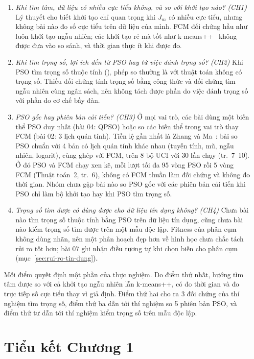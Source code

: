 \begin{enumerate}
  \item \emph{Khi tìm tâm, dữ liệu có nhiều cực tiểu không, và so với khởi tạo nào? (CH1)} Lý thuyết cho biết khởi tạo chỉ
  quan trọng khi $J_m$ có nhiều cực tiểu, nhưng không bài nào đo số cực tiểu trên dữ liệu của mình. FCM đối chứng hầu như luôn
  khởi tạo ngẫu nhiên; các khởi tạo rẻ mà tốt như k-means++~\cite{arthur2007kmeanspp} không được đưa vào so sánh, và thời
  gian thực ít khi được đo.
  \item \emph{Khi tìm trọng số, lợi ích đến từ PSO hay từ việc đánh trọng số? (CH2)} Khi PSO tìm trọng số thuộc tính
  (\cite{lu2011psovw,oneill2018psofw}), phép so thường là với thuật toán không có trọng số. Thiếu đối chứng tính trọng số
  bằng công thức và đối chứng tìm ngẫu nhiên cùng ngân sách, nên không tách được phần do việc đánh trọng số với phần do cơ
  chế bầy đàn.
  \item \emph{PSO gốc hay phiên bản cải tiến? (CH3)} Ở mọi vai trò, các bài dùng một biến thể PSO duy nhất (bài 04: QPSO) hoặc
  so các biến thể trong vai trò thay FCM (bài 02: 3 lịch quán tính). Tiền lệ gần nhất là Zhang và Ma~\cite{zhang2020elpso}: bài so PSO
  chuẩn với 4 bản có lịch quán tính khác nhau (tuyến tính, mũ, ngẫu nhiên, logarit), cùng ghép với FCM, trên 8 bộ UCI
  với 30 lần chạy (tr.~7--10). Ở đó PSO và FCM chạy xen kẽ, mỗi lượt tối đa 95 vòng PSO rồi 5 vòng FCM (Thuật toán~2,
  tr.~6), không có FCM thuần làm đối chứng và không đo thời gian. Nhóm chưa gặp bài nào so PSO gốc với các phiên bản cải
  tiến khi PSO chỉ làm bộ khởi tạo hay khi PSO tìm trọng số.
  \item \emph{Trọng số tìm được có dùng được cho dữ liệu tín dụng không? (CH4)} Chưa bài nào tìm trọng số thuộc tính bằng PSO
  trên dữ liệu tín dụng, cũng chưa bài nào kiểm trọng số tìm được trên một mẫu độc lập. Fitness của phân cụm không dùng nhãn,
  nên một phân hoạch đẹp hơn về hình học chưa chắc tách rủi ro tốt hơn; bài 07 ghi nhận điều tương tự khi chọn biến cho phân
  cụm (mục~\ref{sec:rui-ro-tin-dung}).
\end{enumerate}

Mỗi điểm quyết định một phần của thực nghiệm. Do điểm thứ nhất, hướng tìm tâm được so với cả khởi tạo ngẫu nhiên lẫn
k-means++, có đo thời gian và đo trực tiếp số cực tiểu thay vì giả định. Điểm thứ hai cho ra 3 đối chứng của thí nghiệm
tìm trọng số, điểm thứ ba dẫn tới thí nghiệm so 5 phiên bản PSO, và điểm thứ tư dẫn tới thí nghiệm kiểm trọng số trên
mẫu độc lập.

\section*{Tiểu kết Chương 1}
\label{sec:tieu-ket-ch1}

